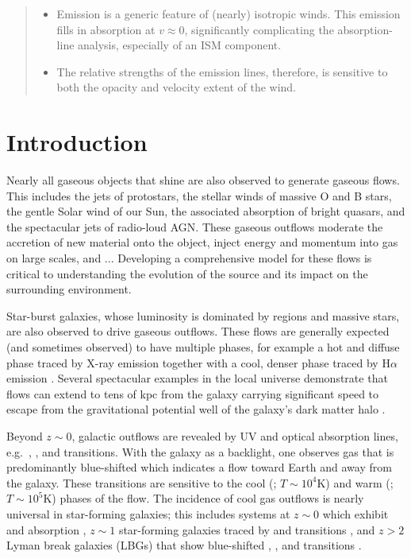 \documentclass[12pt,preprint]{aastex}
\begin{document}
\begin{abstract}
\begin{itemize}
\item Emission is a generic feature of (nearly) isotropic winds.  This
  emission fills in absorption at $v \approx 0$, significantly
  complicating the absorption-line analysis, especially of an ISM
  component. 
\item The relative strengths of the emission
lines, therefore, is sensitive to both the opacity and velocity
extent of the wind.
\end{itemize}
\end{abstract}


\section{Introduction}

Nearly all gaseous objects that shine are also
observed to generate gaseous flows.  This includes the jets of protostars, the
stellar winds of massive O and B stars, the gentle Solar wind
of our Sun, the associated absorption of bright quasars, and the
spectacular jets of radio-loud AGN.   These gaseous outflows moderate
the accretion of new material onto the object, inject energy and
momentum into gas on large scales, and ...
Developing a comprehensive model for these flows is critical to
understanding the evolution of the source and its impact on the
surrounding environment.

Star-burst galaxies, whose luminosity is dominated by  regions
and massive stars, are also observed to drive gaseous outflows.  These
flows are generally expected (and sometimes observed) to have multiple
phases, for example a hot and diffuse phase traced by X-ray emission
together with a cool, denser phase traced by H$\alpha$ emission 
\citep[e.g.][]{shc+04,km10}. 
Several spectacular
examples in the local universe demonstrate that flows can extend to
tens of kpc from the galaxy \citep{M87} carrying significant speed
to escape from the gravitational potential well of the galaxy's dark
matter halo \citep{wind_escape}.

Beyond $z \sim 0$, galactic outflows are 
revealed by UV and optical absorption lines, e.g.\ ,
,  and  transitions.  With the galaxy
as a backlight, one observes gas that is predominantly
blue-shifted which indicates a flow toward
Earth and away from the galaxy.  These transitions are sensitive to
the cool (; $T \sim 10^4$K) and warm (; $T \sim
10^5$K) phases of the flow.  The incidence of cool gas outflows is
nearly universal in star-forming galaxies;  this includes systems at $z \sim 0$
which exhibit  and  absorption
\citep{rvs05a,martin05,smn+09}, $z \sim 1$ star-forming galaxies traced by
 and  transitions \citep{wcp+09,rubin09}, and
$z>2$ Lyman break galaxies (LBGs) that show blue-shifted ,
, and  transitions \citep{sgp+96,lkg+97,shapley03}.
\end{document}
